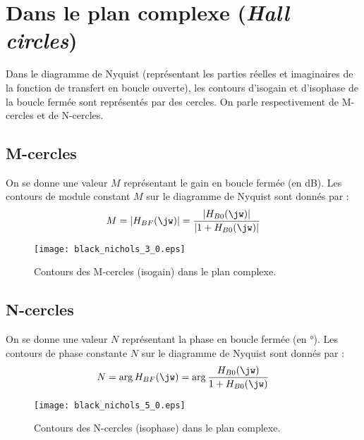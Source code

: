 \section{Dans le plan complexe (\emph{Hall circles})}
Dans le diagramme de Nyquist (représentant les parties réelles et 
imaginaires de la fonction de transfert en boucle ouverte), les contours 
d'isogain et d'isophase de la boucle fermée sont représentés par des cercles. 
On parle respectivement de M-cercles et de N-cercles. 
\subsection{M-cercles}
On se donne une valeur $M$ représentant le gain en boucle fermée (en \si{\dB}). 
Les contours de module constant $M$ sur le diagramme de Nyquist 
sont donnés par :
\[
    M=|H_{BF}(\jw)|=\dfrac{|H_{B0}(\jw)|}{|1+H_{B0}(\jw)|}
\]
\begin{figure}[!h]
    \centering
    \texttt{[image: black\_nichols\_3\_0.eps]}
    \caption{Contours des M-cercles (isogain) dans le plan complexe.}
\end{figure}
\subsection{N-cercles}
On se donne une valeur $N$ représentant la phase en boucle fermée 
(en \si{\degree}). Les contours de phase constante $N$ sur le diagramme 
de Nyquist sont donnés par :
\[
    N=\arg{H_{BF}(\jw)}=\arg{\dfrac{H_{B0}(\jw)}{1+H_{B0}(\jw)}}
\]
\begin{figure}[!h]
    \centering
    \texttt{[image: black\_nichols\_5\_0.eps]}
    \caption{Contours des N-cercles (isophase) dans le plan complexe.}
\end{figure}
\clearpage
